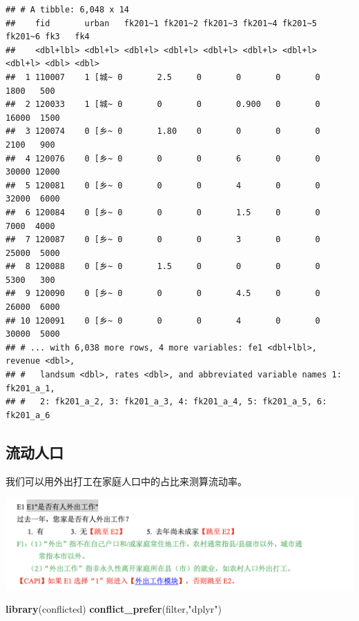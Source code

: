 \documentclass[
  oneside]{book}
\newenvironment{Shaded}{\begin{snugshade}}{\end{snugshade}}
\newcommand{\FunctionTok}[1]{\textcolor[rgb]{0.13,0.29,0.53}{\textbf{#1}}}
\newcommand{\NormalTok}[1]{#1}
\newcommand{\StringTok}[1]{\textcolor[rgb]{0.31,0.60,0.02}{#1}}
\begin{document}
\begin{verbatim}
## # A tibble: 6,048 x 14
##    fid       urban   fk201~1 fk201~2 fk201~3 fk201~4 fk201~5 fk201~6 fk3   fk4  
##    <dbl+lbl> <dbl+l> <dbl+l> <dbl+l> <dbl+l> <dbl+l> <dbl+l> <dbl+l> <dbl> <dbl>
##  1 110007    1 [城~ 0       2.5     0       0       0       0        1800   500
##  2 120033    1 [城~ 0       0       0       0.900   0       0       16000  1500
##  3 120074    0 [乡~ 0       1.80    0       0       0       0        2100   900
##  4 120076    0 [乡~ 0       0       0       6       0       0       30000 12000
##  5 120081    0 [乡~ 0       0       0       4       0       0       32000  6000
##  6 120084    0 [乡~ 0       0       0       1.5     0       0        7000  4000
##  7 120087    0 [乡~ 0       0       0       3       0       0       25000  5000
##  8 120088    0 [乡~ 0       1.5     0       0       0       0        5300   300
##  9 120090    0 [乡~ 0       0       0       4.5     0       0       26000  6000
## 10 120091    0 [乡~ 0       0       0       4       0       0       30000  5000
## # ... with 6,038 more rows, 4 more variables: fe1 <dbl+lbl>, revenue <dbl>,
## #   landsum <dbl>, rates <dbl>, and abbreviated variable names 1: fk201_a_1,
## #   2: fk201_a_2, 3: fk201_a_3, 4: fk201_a_4, 5: fk201_a_5, 6: fk201_a_6
\end{verbatim}

\hypertarget{ux6d41ux52a8ux4ebaux53e3}{%
\subsection{流动人口}\label{ux6d41ux52a8ux4ebaux53e3}}

我们可以用外出打工在家庭人口中的占比来测算流动率。

\includegraphics{image/fe1.png}

\begin{Shaded}
\begin{Highlighting}[]
\FunctionTok{library}\NormalTok{(conflicted)}
\FunctionTok{conflict\_prefer}\NormalTok{(}\StringTok{\textquotesingle{}filter\textquotesingle{}}\NormalTok{,}\StringTok{"dplyr"}\NormalTok{)}
\end{Highlighting}
\end{Shaded}
\end{document}
